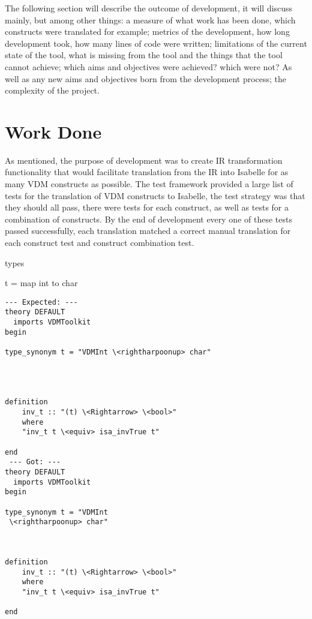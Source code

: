 The following section will describe the outcome of development, it will discuss mainly, but among other things: a measure of what work has been done, which constructs were translated for example; metrics of the development, how long development took, how many lines of code were written; limitations of the current state of the tool, what is missing from the tool and the things that the tool cannot achieve; which aims and objectives were achieved? which were not? As well as any new aims and objectives born from the development process; the complexity of the project.

\section{Work Done}
As mentioned, the purpose of development was to create IR transformation functionality that would facilitate translation from the IR into Isabelle for as many VDM constructs as possible. The test framework provided a large list of tests for the translation of VDM constructs to Isabelle, the test strategy was that they should all pass, there were tests for each construct, as well as tests for a combination of constructs. By the end of development every one of these tests passed successfully, each translation matched a correct manual translation for each construct test and construct combination test.
\begin{vdmsl}[label=lst:MapIntChar.vdmsl, caption=The VDM-SL test file\, MapIntChar.vdmsl. This test file tests that the translation of a VDM-SL map\, and a combination of int and char constructs\, matches a previously manually translated correct translation\, seen below in MapIntChar.vdmsl.result. If the translation matches\, the tool successfully translates this construct.]
types

t = map int to char
\end{vdmsl} 
\begin{lstlisting}[language=Isabelle, label=lst:MapIntChar.vdmsl.result, caption=The MapIntChar.vdmsl.result file specifies that the below is the correct translation\, and the output of the tool applied to MapIntChar.vdmsl should match it. The file specifies that not only should the type be translated but so should also have generated invariant for it. The output\, under the word "Got:" matches\, and so this test passes\, this construct is successfully translated.]
 --- Expected: ---
theory DEFAULT
  imports VDMToolkit
begin

type_synonym t = "VDMInt \<rightharpoonup> char"




definition
    inv_t :: "(t) \<Rightarrow> \<bool>"
    where
    "inv_t t \<equiv> isa_invTrue t"

end
 --- Got: ---
theory DEFAULT
  imports VDMToolkit
begin

type_synonym t = "VDMInt
 \<rightharpoonup> char"



definition
	inv_t :: "(t) \<Rightarrow> \<bool>"
    where
    "inv_t t \<equiv> isa_invTrue t"

end
\end{lstlisting}

